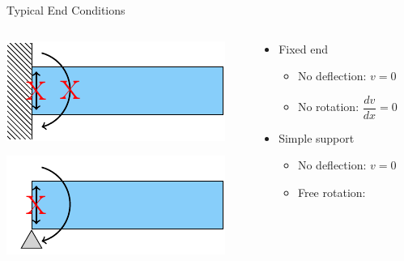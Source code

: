 \documentclass[10pt, svgnames]{beamer}
\begin{document}
\begin{frame}[label={sec:org93cf080}]{Typical End Conditions}
\begin{columns}
\begin{column}{0.5\columnwidth}
\begin{center}
\includegraphics[width=.9\linewidth]{pictures/fixed-end.pdf}
\end{center}

\begin{center}
\includegraphics[width=.9\linewidth]{pictures/simple-support.pdf}
\end{center}
\end{column}

\begin{column}{0.5\columnwidth}
\begin{itemize}
\item Fixed end

\begin{itemize}
\item No deflection: \(v = 0\)

\item No rotation: \(\dfrac{dv}{dx} = 0\)
\end{itemize}

\item Simple support

\begin{itemize}
\item No deflection: \(v = 0\)

\item Free rotation:
\end{itemize}
\end{itemize}
\end{column}
\end{columns}
\end{frame}
\end{document}
